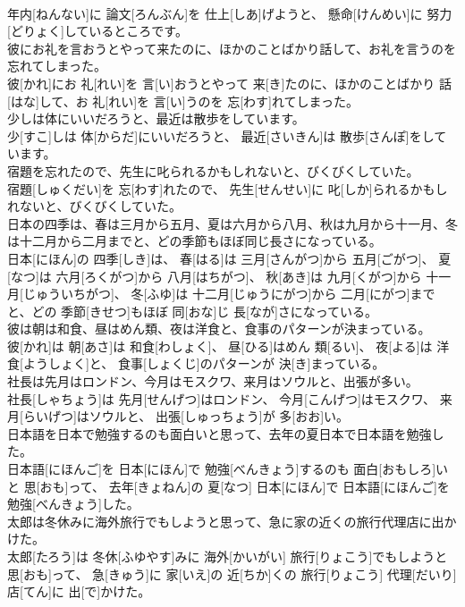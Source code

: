 \documentclass[8pt]{extreport}
\begin{document}
\begin{CJK}{UTF8}{min}
\\	年内[ねんない]に 論文[ろんぶん]を 仕上[しあ]げようと、 懸命[けんめい]に 努力[どりょく]しているところです。
\\	彼にお礼を言おうとやって来たのに、ほかのことばかり話して、お礼を言うのを忘れてしまった。	
\\	彼[かれ]にお 礼[れい]を 言[い]おうとやって 来[き]たのに、ほかのことばかり 話[はな]して、お 礼[れい]を 言[い]うのを 忘[わす]れてしまった。
\\	少しは体にいいだろうと、最近は散歩をしています。	
\\	少[すこ]しは 体[からだ]にいいだろうと、 最近[さいきん]は 散歩[さんぽ]をしています。
\\	宿題を忘れたので、先生に叱られるかもしれないと、びくびくしていた。	
\\	宿題[しゅくだい]を 忘[わす]れたので、 先生[せんせい]に 叱[しか]られるかもしれないと、びくびくしていた。
\\	日本の四季は、春は三月から五月、夏は六月から八月、秋は九月から十一月、冬は十二月から二月までと、どの季節もほぼ同じ長さになっている。	
\\	日本[にほん]の 四季[しき]は、 春[はる]は 三月[さんがつ]から 五月[ごがつ]、 夏[なつ]は 六月[ろくがつ]から 八月[はちがつ]、 秋[あき]は 九月[くがつ]から 十一月[じゅういちがつ]、 冬[ふゆ]は 十二月[じゅうにがつ]から 二月[にがつ]までと、どの 季節[きせつ]もほぼ 同[おな]じ 長[なが]さになっている。
\\	彼は朝は和食、昼はめん類、夜は洋食と、食事のパターンが決まっている。	
\\	彼[かれ]は 朝[あさ]は 和食[わしょく]、 昼[ひる]はめん 類[るい]、 夜[よる]は 洋食[ようしょく]と、 食事[しょくじ]のパターンが 決[き]まっている。
\\	社長は先月はロンドン、今月はモスクワ、来月はソウルと、出張が多い。	
\\	社長[しゃちょう]は 先月[せんげつ]はロンドン、 今月[こんげつ]はモスクワ、 来月[らいげつ]はソウルと、 出張[しゅっちょう]が 多[おお]い。
\\	日本語を日本で勉強するのも面白いと思って、去年の夏日本で日本語を勉強した。	
\\	日本語[にほんご]を 日本[にほん]で 勉強[べんきょう]するのも 面白[おもしろ]いと 思[おも]って、 去年[きょねん]の 夏[なつ] 日本[にほん]で 日本語[にほんご]を 勉強[べんきょう]した。
\\	太郎は冬休みに海外旅行でもしようと思って、急に家の近くの旅行代理店に出かけた。	
\\	太郎[たろう]は 冬休[ふゆやす]みに 海外[かいがい] 旅行[りょこう]でもしようと 思[おも]って、 急[きゅう]に 家[いえ]の 近[ちか]くの 旅行[りょこう] 代理[だいり] 店[てん]に 出[で]かけた。

\end{CJK}
\end{document}
